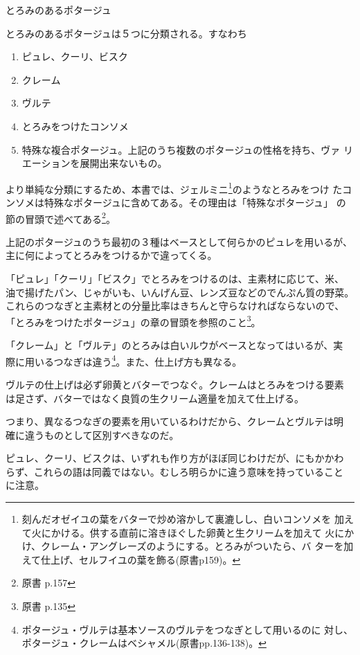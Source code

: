 
とろみのあるポタージュ

とろみのあるポタージュは５つに分類される。すなわち

\begin{enumerate}
\def\labelenumi{\arabic{enumi})}
\item
  ピュレ、クーリ、ビスク
\item
  クレーム
\item
  ヴルテ
\item
  とろみをつけたコンソメ
\item
  特殊な複合ポタージュ。上記のうち複数のポタージュの性格を持ち、ヴァ
  リエーションを展開出来ないもの。
\end{enumerate}

より単純な分類にするため、本書では、ジェルミニ\footnote{刻んだオゼイユの葉をバターで炒め溶かして裏漉しし、白いコンソメを
  加えて火にかける。供する直前に溶きほぐした卵黄と生クリームを加えて
  火にかけ、クレーム・アングレーズのようにする。とろみがついたら、バ
  ターを加えて仕上げ、セルフイユの葉を飾る(原書p159)。}のようなとろみをつけ
たコンソメは特殊なポタージュに含めてある。その理由は「特殊なポタージュ」
の節の冒頭で述べてある\footnote{原書 p.157}。

上記のポタージュのうち最初の３種はベースとして何らかのピュレを用いるが、
主に何によってとろみをつけるかで違ってくる。

「ピュレ」「クーリ」「ビスク」でとろみをつけるのは、主素材に応じて、米、
油で揚げたパン、じゃがいも、いんげん豆、レンズ豆などのでんぷん質の野菜。
これらのつなぎと主素材との分量比率はきちんと守らなければならないので、
「とろみをつけたポタージュ」の章の冒頭を参照のこと\footnote{原書 p.135}。

「クレーム」と「ヴルテ」のとろみは白いルウがベースとなってはいるが、実
際に用いるつなぎは違う\footnote{ポタージュ・ヴルテは基本ソースのヴルテをつなぎとして用いるのに
  対し、ポタージュ・クレームはベシャメル(原書pp.136-138)。}。また、仕上げ方も異なる。

ヴルテの仕上げは必ず卵黄とバターでつなぐ。クレームはとろみをつける要素
は足さず、バターではなく良質の生クリーム適量を加えて仕上げる。

つまり、異なるつなぎの要素を用いているわけだから、クレームとヴルテは明
確に違うものとして区別すべきなのだ。

ピュレ、クーリ、ビスクは、いずれも作り方がほぼ同じわけだが、にもかかわ
らず、これらの語は同義ではない。むしろ明らかに違う意味を持っていること
に注意。


